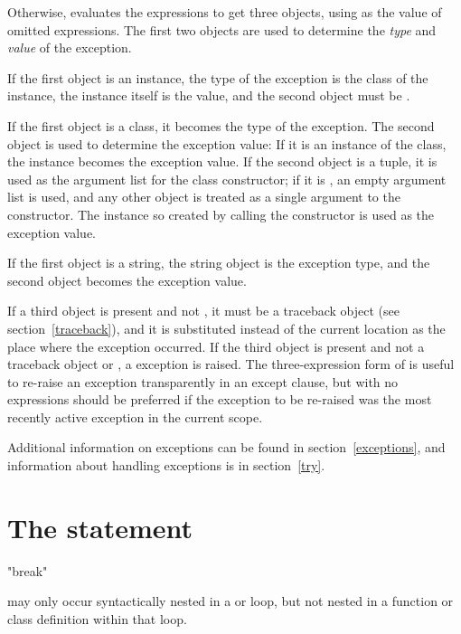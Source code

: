 Otherwise,  evaluates the expressions to get three
objects, using  as the value of omitted expressions.  The
first two objects are used to determine the \emph{type} and
\emph{value} of the exception.

If the first object is an instance, the type of the exception is the
class of the instance, the instance itself is the value, and the
second object must be .

If the first object is a class, it becomes the type of the exception.
The second object is used to determine the exception value: If it is
an instance of the class, the instance becomes the exception value.
If the second object is a tuple, it is used as the argument list for
the class constructor; if it is , an empty argument list is
used, and any other object is treated as a single argument to the
constructor.  The instance so created by calling the constructor is
used as the exception value.

If the first object is a string, the string object is the exception
type, and the second object becomes the exception value.

If a third object is present and not , it must be a
traceback object (see section~\ref{traceback}), and
it is substituted instead of the current location as the place where
the exception occurred.  If the third object is present and not a
traceback object or , a  exception is
raised.  The three-expression form of  is useful to
re-raise an exception transparently in an except clause, but
 with no expressions should be preferred if the
exception to be re-raised was the most recently active exception in
the current scope.

Additional information on exceptions can be found in
section~\ref{exceptions}, and information about handling exceptions is
in section~\ref{try}.


\section{The  statement \label{break}}

\begin{productionlist}
             {"break"}
\end{productionlist}

 may only occur syntactically nested in a 
or  loop, but not nested in a function or class definition
within that loop.

